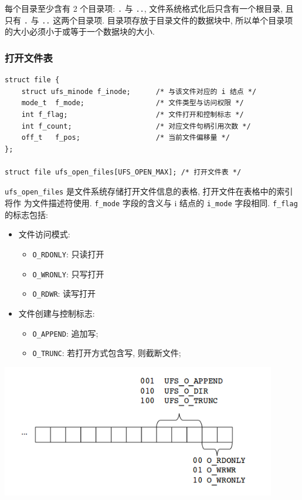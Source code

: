 \documentclass[nofonts]{ctexart}
\begin{document}
每个目录至少含有 2 个目录项: \texttt{.} 与 \texttt{..},
文件系统格式化后只含有一个根目录, 且只有 \texttt{.} 与 \texttt{..}
这两个目录项. 目录项存放于目录文件的数据块中,
所以单个目录项的大小必须小于或等于一个数据块的大小.

\subsubsection{打开文件表}\label{ux6253ux5f00ux6587ux4ef6ux8868}

\begin{verbatim}
struct file {
    struct ufs_minode f_inode;      /* 与该文件对应的 i 结点 */
    mode_t  f_mode;                 /* 文件类型与访问权限 */
    int f_flag;                     /* 文件打开和控制标志 */
    int f_count;                    /* 对应文件句柄引用次数 */
    off_t   f_pos;                  /* 当前文件偏移量 */
};

struct file ufs_open_files[UFS_OPEN_MAX]; /* 打开文件表 */
\end{verbatim}

\texttt{ufs\_open\_files} 是文件系统存储打开文件信息的表格,
打开文件在表格中的索引将作 为文件描述符使用. \texttt{f\_mode}
字段的含义与 i 结点的 \texttt{i\_mode} 字段相同. \texttt{f\_flag}
的标志包括:
\begin{itemize}
    \item
        文件访问模式: 
        \begin{itemize}
            \item
                \texttt{O\_RDONLY}: 只读打开
            \item
                \texttt{O\_WRONLY}: 只写打开
            \item
                \texttt{O\_RDWR}: 读写打开
        \end{itemize}
    \item
        文件创建与控制标志: 
        \begin{itemize}
            \item
                \texttt{O\_APPEND}: 追加写; 
            \item
                \texttt{O\_TRUNC}:
                若打开方式包含写, 则截断文件;
        \end{itemize}
\end{itemize}

\begin{center}
\includegraphics[width=12cm]{./images/./file_mode.png}
\end{center}
\label{fig:f_mode}
\end{document}

